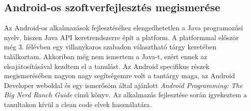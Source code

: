 \documentclass[../main.tex]{subfiles}
\begin{document}
    \subsection{Android-os szoftverfejlesztés megismerése}
        Az Android-os alkalmazások fejlesztéséhez elengedhetetlen a Java programozási nyelv, hiszen Java API keretrendszerre épít a platform. A platformmal először még 3. félévben egy villanykaros szabadon választható tárgy keretében találkoztam. Akkoriban még nem ismertem a Java-t, ezért ennek az elsajátosításával kezdtem el a tanulást\cite{b_java}. Az Android specifikus részek megismerésében nagyon nagy segítségemre volt a tantárgy maga, az Android Developer weboldal\cite{android_guides} és egy ismerősöm által ajánlott \textit{Android Programming: The Big Nerd Ranch Guide} című könyv\cite{b_android2}. Az alkalmazás fejlesztése során igyekeztem a tanultakon kívül a clean code elvek használatára\cite{android_clean_code}.
        
        
            
            
\end{document}

